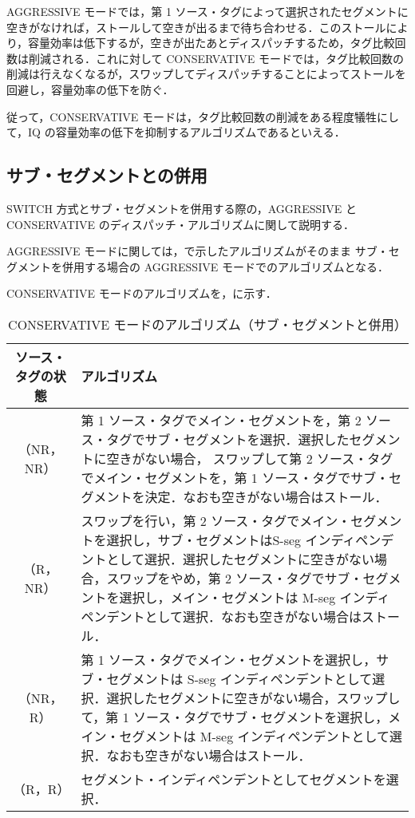 AGGRESSIVE モードでは，第 1 ソース・タグによって選択されたセグメントに空きがなければ，ストールして空きが出るまで待ち合わせる．このストールにより，容量効率は低下するが，空きが出たあとディスパッチするため，タグ比較回数は削減される．これに対して CONSERVATIVE モードでは，タグ比較回数の削減は行えなくなるが，スワップしてディスパッチすることによってストールを回避し，容量効率の低下を防ぐ．

従って，CONSERVATIVE モードは，タグ比較回数の削減をある程度犠牲にして，IQ の容量効率の低下を抑制するアルゴリズムであるといえる．

\subsection{サブ・セグメントとの併用}
SWITCH 方式とサブ・セグメントを併用する際の，AGGRESSIVE と CONSERVATIVE のディスパッチ・アルゴリズムに関して説明する．

AGGRESSIVE モードに関しては，で示したアルゴリズムがそのまま サブ・セグメントを併用する場合の AGGRESSIVE モードでのアルゴリズムとなる．

CONSERVATIVE モードのアルゴリズムを，に示す．
\begin{table}[htb]
  \caption{CONSERVATIVE モードのアルゴリズム（サブ・セグメントと併用）}
  \footnotesize
  \center
   \begin{tabular}{|c|p{13.5cm}|} \hline \hline
    ソース・タグの状態 & アルゴリズム \\ \hline
    （NR，NR） & 第 1 ソース・タグでメイン・セグメントを，第 2 ソース・タグでサブ・セグメントを選択．選択したセグメントに空きがない場合， スワップして第 2 ソース・タグでメイン・セグメントを，第 1 ソース・タグでサブ・セグメントを決定．なおも空きがない場合はストール． \\ \hline
    （R，NR） & スワップを行い，第 2 ソース・タグでメイン・セグメントを選択し，サブ・セグメントはS-seg インディペンデントとして選択．選択したセグメントに空きがない場合，スワップをやめ，第 2 ソース・タグでサブ・セグメントを選択し，メイン・セグメントは M-seg インディペンデントとして選択．なおも空きがない場合はストール．\\ \hline
    （NR，R） & 第 1 ソース・タグでメイン・セグメントを選択し，サブ・セグメントは S-seg インディペンデントとして選択．選択したセグメントに空きがない場合，スワップして，第 1 ソース・タグでサブ・セグメントを選択し，メイン・セグメントは M-seg インディペンデントとして選択．なおも空きがない場合はストール．\\ \hline
    （R，R） & セグメント・インディペンデントとしてセグメントを選択． \\ \hline
  \end{tabular}
  \label{tab:cons_algorithm_subseg}
\end{table}

